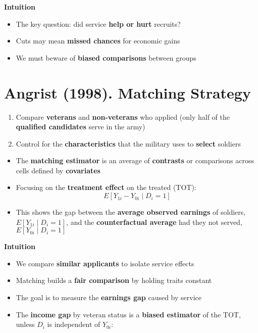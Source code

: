 \documentclass[12pt]{article}
\begin{document}
\textbf{Intuition}
\begin{itemize}
    \item The key question: did service \textbf{help or hurt} recruits?
    \item Cuts may mean \textbf{missed chances} for economic gains
    \item We must beware of \textbf{biased comparisons} between groups
\end{itemize}

\section*{\noindent\textbf{Angrist (1998). Matching Strategy}}

\begin{enumerate}
    \item Compare \textbf{veterans} and \textbf{non-veterans} who applied (only half of the \textbf{qualified candidates} serve in the army)
    \item Control for the \textbf{characteristics} that the military uses to \textbf{select} soldiers
\end{enumerate}

\begin{itemize}
    \item The \textbf{matching estimator} is an average of \textbf{contrasts} or comparisons across cells defined by \textbf{covariates}
    \item Focusing on the \textbf{treatment effect} on the treated (TOT):  
    \[
    E[Y_{1i} - Y_{0i} \mid D_i = 1]
    \]
    \item This shows the gap between the \textbf{average observed earnings} of soldiers, \(E[Y_{1i}\mid D_i=1]\), and the \textbf{counterfactual average} had they not served, \(E[Y_{0i}\mid D_i=1]\)
\end{itemize}

\textbf{Intuition}
\begin{itemize}
    \item We compare \textbf{similar applicants} to isolate service effects
    \item Matching builds a \textbf{fair comparison} by holding traits constant
    \item The goal is to measure the \textbf{earnings gap} caused by service
\end{itemize}

\begin{itemize}
    \item The \textbf{income gap} by veteran status is a \textbf{biased estimator} of the TOT, unless \(D_i\) is independent of \(Y_{0i}\):
\end{itemize}
\end{document}
